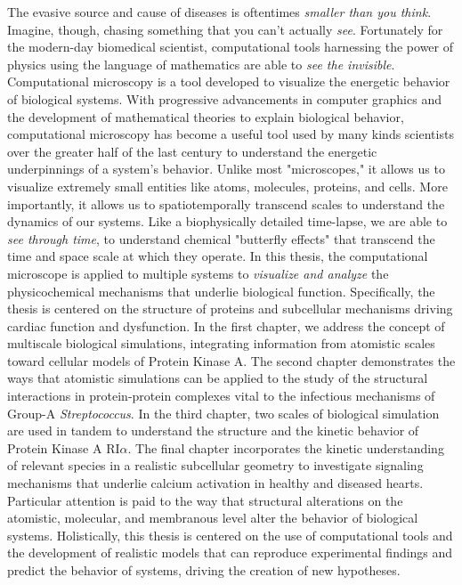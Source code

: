 \documentclass[12pt]{ucsddissertation}
\begin{document}
 

\begin{dissertationabstract}
\vspace{0.3pt}

The evasive source and cause of diseases is oftentimes \textit{smaller than you think}. Imagine, though, chasing something that you can't actually \textit{see}. Fortunately for the modern-day biomedical scientist, computational tools harnessing the power of physics using the language of mathematics are able to \textit{see the invisible}. Computational microscopy is a tool developed to visualize the energetic behavior of biological systems. With progressive advancements in computer graphics and the development of mathematical theories to explain biological behavior, computational microscopy has become a useful tool used by many kinds scientists over the greater half of the last century to understand the energetic underpinnings of a system's behavior. Unlike most "microscopes," it allows us to visualize extremely small entities like atoms, molecules, proteins, and cells. More importantly, it allows us to spatiotemporally transcend scales to understand the dynamics of our systems. Like a biophysically detailed time-lapse, we are able to \textit{see through time}, to understand chemical "butterfly effects" that transcend the time and space scale at which they operate. In this thesis, the computational microscope is applied to multiple systems to \textit{visualize and analyze} the physicochemical mechanisms that underlie biological function. Specifically, the thesis is centered on the structure of proteins and subcellular mechanisms driving cardiac function and dysfunction. In the first chapter, we address the concept of multiscale biological simulations, integrating information from atomistic scales toward cellular models of Protein Kinase A. The second chapter demonstrates the ways that atomistic simulations can be applied to the study of the structural interactions in protein-protein complexes vital to the infectious mechanisms of Group-A \textit{Streptococcus}. In the third chapter, two scales of biological simulation are used in tandem to understand the structure and the kinetic behavior of Protein Kinase A RI$\alpha$. The final chapter incorporates the kinetic understanding of relevant species in a realistic subcellular geometry to investigate signaling mechanisms that underlie calcium activation in healthy and diseased hearts. Particular attention is paid to the way that structural alterations on the atomistic, molecular, and membranous level alter the behavior of biological systems. Holistically, this thesis is centered on the use of computational tools and the development of realistic models that can reproduce experimental findings and predict the behavior of systems, driving the creation of new hypotheses. 

\end{dissertationabstract}
\end{document}
